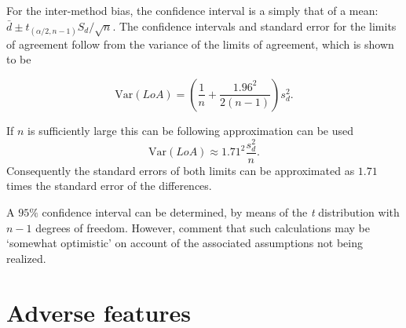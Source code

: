 \documentclass[12pt, a4paper]{report}
\theoremstyle{plain}
\theoremstyle{definition}
\theoremstyle{remark}
\begin{document}
	For the inter-method bias, the confidence interval is a simply that of a mean: $\bar{d} \pm t_{(\alpha/2,n-1)} S_{d}/\sqrt{n}$.
	The confidence
	intervals and standard error for the limits of agreement follow from the variance of the limits of agreement, which is shown to be
	
	\[
	\mbox{Var}(LoA) = (\frac{1}{n}+\frac{1.96^{2}}{2(n-1)})s_{d}^{2}.
	\]
	
	If $n$ is sufficiently large this can be following approximation
	can be used
	\[
	\mbox{Var}(LoA) \approx 1.71^{2}\frac{s_{d}^{2}}{n}.
	\]
	Consequently the standard errors of both limits can be
	approximated as $1.71$ times the standard error of the
	differences.
	
	A $95\%$ confidence interval can be determined, by means of the
	\emph{t} distribution with $n-1$ degrees of freedom. However, \citet*{BA99} comment that such calculations  may be `somewhat optimistic' on account of the associated assumptions not being realized.
	
	
	


	\section{Adverse features}
	
\end{document}

